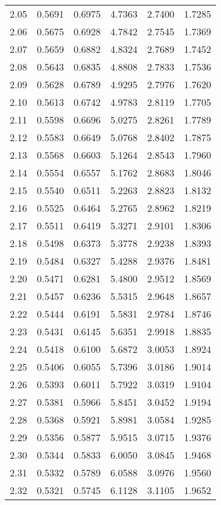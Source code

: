 \documentclass{article}
\begin{document}
\begin{longtable}{cccccc}
2.05 & 0.5691 & 0.6975 & 4.7363 & 2.7400 & 1.7285 \\
2.06 & 0.5675 & 0.6928 & 4.7842 & 2.7545 & 1.7369 \\
2.07 & 0.5659 & 0.6882 & 4.8324 & 2.7689 & 1.7452 \\
2.08 & 0.5643 & 0.6835 & 4.8808 & 2.7833 & 1.7536 \\
2.09 & 0.5628 & 0.6789 & 4.9295 & 2.7976 & 1.7620 \\
2.10 & 0.5613 & 0.6742 & 4.9783 & 2.8119 & 1.7705 \\
2.11 & 0.5598 & 0.6696 & 5.0275 & 2.8261 & 1.7789 \\
2.12 & 0.5583 & 0.6649 & 5.0768 & 2.8402 & 1.7875 \\
2.13 & 0.5568 & 0.6603 & 5.1264 & 2.8543 & 1.7960 \\
2.14 & 0.5554 & 0.6557 & 5.1762 & 2.8683 & 1.8046 \\
2.15 & 0.5540 & 0.6511 & 5.2263 & 2.8823 & 1.8132 \\
2.16 & 0.5525 & 0.6464 & 5.2765 & 2.8962 & 1.8219 \\
2.17 & 0.5511 & 0.6419 & 5.3271 & 2.9101 & 1.8306 \\
2.18 & 0.5498 & 0.6373 & 5.3778 & 2.9238 & 1.8393 \\
2.19 & 0.5484 & 0.6327 & 5.4288 & 2.9376 & 1.8481 \\
2.20 & 0.5471 & 0.6281 & 5.4800 & 2.9512 & 1.8569 \\
2.21 & 0.5457 & 0.6236 & 5.5315 & 2.9648 & 1.8657 \\
2.22 & 0.5444 & 0.6191 & 5.5831 & 2.9784 & 1.8746 \\
2.23 & 0.5431 & 0.6145 & 5.6351 & 2.9918 & 1.8835 \\
2.24 & 0.5418 & 0.6100 & 5.6872 & 3.0053 & 1.8924 \\
2.25 & 0.5406 & 0.6055 & 5.7396 & 3.0186 & 1.9014 \\
2.26 & 0.5393 & 0.6011 & 5.7922 & 3.0319 & 1.9104 \\
2.27 & 0.5381 & 0.5966 & 5.8451 & 3.0452 & 1.9194 \\
2.28 & 0.5368 & 0.5921 & 5.8981 & 3.0584 & 1.9285 \\
2.29 & 0.5356 & 0.5877 & 5.9515 & 3.0715 & 1.9376 \\
2.30 & 0.5344 & 0.5833 & 6.0050 & 3.0845 & 1.9468 \\
2.31 & 0.5332 & 0.5789 & 6.0588 & 3.0976 & 1.9560 \\
2.32 & 0.5321 & 0.5745 & 6.1128 & 3.1105 & 1.9652 \\

\end{longtable}
\end{document}
